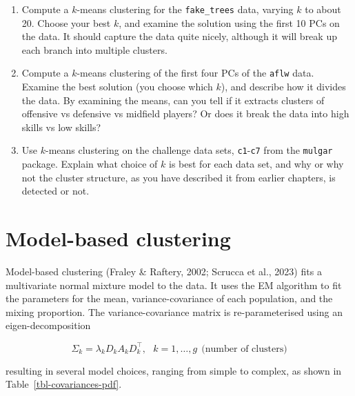 \documentclass[
  letterpaper,
]{krantz}
\providecommand{\tightlist}{%
  \setlength{\itemsep}{0pt}\setlength{\parskip}{0pt}}\usepackage{longtable,booktabs,array}
\begin{document}
\begin{enumerate}
\def\labelenumi{\arabic{enumi}.}
\tightlist
\item
  Compute a \(k\)-means clustering for the \texttt{fake\_trees} data,
  varying \(k\) to about 20. Choose your best \(k\), and examine the
  solution using the first 10 PCs on the data. It should capture the
  data quite nicely, although it will break up each branch into multiple
  clusters.
\item
  Compute a \(k\)-means clustering of the first four PCs of the
  \texttt{aflw} data. Examine the best solution (you choose which
  \(k\)), and describe how it divides the data. By examining the means,
  can you tell if it extracts clusters of offensive vs defensive vs
  midfield players? Or does it break the data into high skills vs low
  skills?
\item
  Use \(k\)-means clustering on the challenge data sets,
  \texttt{c1}-\texttt{c7} from the \texttt{mulgar} package. Explain what
  choice of \(k\) is best for each data set, and why or why not the
  cluster structure, as you have described it from earlier chapters, is
  detected or not.
\end{enumerate}

\chapter{Model-based clustering}\label{sec-mclust}


Model-based clustering (Fraley \& Raftery, 2002; Scrucca et al., 2023)
fits a multivariate normal mixture model to the data. It uses the EM
algorithm to fit the parameters for the mean, variance-covariance of
each population, and the mixing proportion. The variance-covariance
matrix is re-parameterised using an eigen-decomposition

\[
\Sigma_k = \lambda_kD_kA_kD_k^\top, ~~~k=1, \dots, g ~~\mbox{(number of clusters)}
\]

\noindent resulting in several model choices, ranging from simple to
complex, as shown in Table~\ref{tbl-covariances-pdf}.
\end{document}
